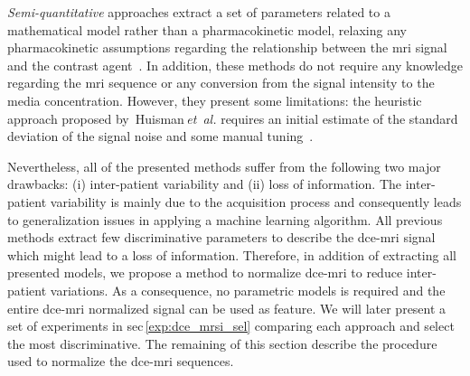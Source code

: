 \documentclass[final,3p,times,twocolumn]{elsarticle}
\begin{document}
\emph{Semi-quantitative} approaches extract a set of parameters related to a
mathematical model rather than a pharmacokinetic model, relaxing any
pharmacokinetic assumptions regarding the relationship between the \ac{mri}
signal and the contrast
agent~\cite{huisman2001accurate,gliozzi2011phenomenological}. In addition,
these methods do not require any knowledge regarding the \ac{mri} sequence or
any conversion from the signal intensity to the media concentration. However,
they present some limitations: the heuristic approach proposed
by~Huisman\,\emph{et~al.}  requires an initial estimate of the standard
deviation of the signal noise and some manual
tuning~\cite{huisman2001accurate}.

Nevertheless, all of the presented methods suffer from the following two major
drawbacks: (i) inter-patient variability and (ii) loss of information. The
inter-patient variability is mainly due to the acquisition process and
consequently leads to generalization issues in applying a machine learning
algorithm. All previous methods extract few discriminative parameters to
describe the \ac{dce}-\ac{mri} signal which might lead to a loss of
information. Therefore, in addition of extracting all presented models, we
propose a method to normalize \ac{dce}-\ac{mri} to reduce inter-patient
variations. As a consequence, no parametric models is required and the entire
\ac{dce}-\ac{mri} normalized signal can be used as feature. We will later
present a set of experiments in \acs{sec}\,\ref{exp:dce_mrsi_sel} comparing
each approach and select the most discriminative. The remaining of this section
describe the procedure used to normalize the \ac{dce}-\ac{mri} sequences.
\end{document}
